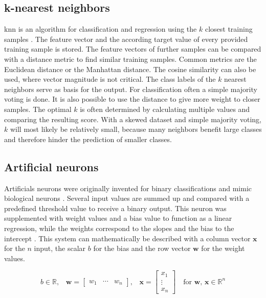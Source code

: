 \subsection{k-nearest neighbors}
\gls{knn} is an algorithm for classification and regression using the $k$ closest training samples \autocite{fix1989,cover1967}. The feature vector and the according target value of every provided training sample is stored. The feature vectors of further samples can be compared with a distance metric to find similar training samples. Common metrics are the Euclidean distance or the Manhattan distance. The cosine similarity can also be used, where vector magnitude is not critical. 
The class labels of the $k$ nearest neighbors serve as basis for the output. For classification often a simple majority voting is done. It is also possible to use the distance to give more weight to closer samples.
The optimal $k$ is often determined by calculating multiple values and comparing the resulting score. With a skewed dataset and simple majority voting, $k$ will most likely be relatively small, because many neighbors benefit large classes and therefore hinder the prediction of smaller classes.


\subsection{Artificial neurons}
Artificials neurons were originally invented for binary classifications and mimic biological neurons \autocite{mcculloch1943}. Several input values are summed up and compared with a predefined threshold value to receive a binary output. This neuron was supplemented with weight values and a bias value to function as a linear regression, while the weights correspond to the slopes and the bias to the intercept  \autocite{rosenblatt1957}. This system can mathematically be described with a column vector $\mathbf{x}$ for the $n$ input, the scalar $b$ for the bias and the row vector $\mathbf{w}$ for the weight values.

\begin{equation}
    \text{$b \in \mathbb{R}$,}\quad\mathbf{w} = \begin{bmatrix}w_1&\cdots &w_n\end{bmatrix}\text{,}\quad\mathbf{x} = \begin{bmatrix}x_1\\\vdots \\x_n\end{bmatrix}\quad\text{for $\mathbf{w}$, $\mathbf{x} \in \mathbb{R}^n$}
\end{equation}

